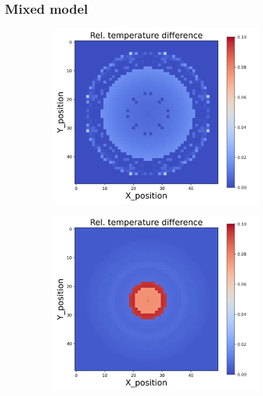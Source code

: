 \subsection{Mixed model}
\begin{figure}[h]
    \centering
    \begin{minipage}{\textwidth}
        \centering
        \begin{subfigure}{0.3\textwidth}
            \centering
            \includegraphics[width=\textwidth]{figures/raw_data/0/mix/T_bias.jpg}
        \end{subfigure}
        \begin{subfigure}{0.3\textwidth}
            \centering
            \includegraphics[width=\textwidth]{figures/raw_data/5/mix/T_bias.jpg}

\end{subfigure}
\end{minipage}
\end{figure}
